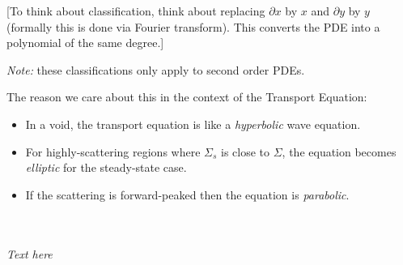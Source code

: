 \documentclass[12pt, answers]{exam}
\newcommand{\Macro}{\ensuremath{\Sigma}}
\begin{document}
[To think about classification, think about replacing $\partial x$ by $x$ and  $\partial y$ by $y$ (formally this is done via Fourier transform). This converts the PDE into a polynomial of the same degree.]

\textit{Note:} these classifications only apply to second order PDEs. 

\noindent The reason we care about this in the context of the Transport Equation:
\ifprintanswers
\begin{itemize}
\item In a void, the transport equation is like a \textit{hyperbolic} wave equation. 
\item For highly-scattering regions where $\Macro_{s}$ is close to $\Macro$, the equation becomes \textit{elliptic} for the steady-state case. 
\item If the scattering is forward-peaked then the equation is \textit{parabolic}.
\end{itemize}
\else
 \\ \\  \hspace*{8em} \textit{Text here} 
\fi
\end{document}

